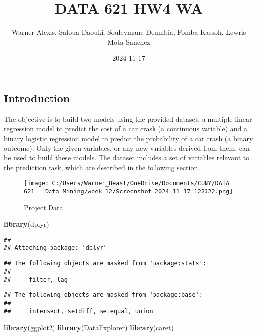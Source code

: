 \documentclass[
]{article}
\title{DATA 621 HW4 WA}
\author{Warner Alexis, Saloua Daouki, Souleymane Doumbia, Fomba Kassoh,
Lewris Mota Sanchez}
\date{2024-11-17}
\newenvironment{Shaded}{\begin{snugshade}}{\end{snugshade}}
\newcommand{\FunctionTok}[1]{\textcolor[rgb]{0.13,0.29,0.53}{\textbf{#1}}}
\newcommand{\NormalTok}[1]{#1}
\begin{document}
\maketitle

{
\setcounter{tocdepth}{3}
\tableofcontents
}
\subsection{Introduction}\label{introduction}

The objective is to build two models using the provided dataset: a
multiple linear regression model to predict the cost of a car crash (a
continuous variable) and a binary logistic regression model to predict
the probability of a car crash (a binary outcome). Only the given
variables, or any new variables derived from them, can be used to build
these models. The dataset includes a set of variables relevant to the
prediction task, which are described in the following section.

\begin{figure}
\centering
\texttt{[image: C:/Users/Warner\_Beast/OneDrive/Documents/CUNY/DATA 621 - Data Mining/week 12/Screenshot 2024-11-17 122322.png]}
\caption{Project Data}
\end{figure}

\begin{Shaded}
\begin{Highlighting}[]
\FunctionTok{library}\NormalTok{(dplyr)}
\end{Highlighting}
\end{Shaded}

\begin{verbatim}
## 
## Attaching package: 'dplyr'
\end{verbatim}

\begin{verbatim}
## The following objects are masked from 'package:stats':
## 
##     filter, lag
\end{verbatim}

\begin{verbatim}
## The following objects are masked from 'package:base':
## 
##     intersect, setdiff, setequal, union
\end{verbatim}

\begin{Shaded}
\begin{Highlighting}[]
\FunctionTok{library}\NormalTok{(ggplot2)}
\FunctionTok{library}\NormalTok{(DataExplorer)}
\FunctionTok{library}\NormalTok{(caret)}
\end{Highlighting}
\end{Shaded}
\end{document}
